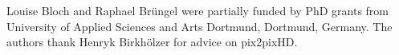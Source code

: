 \documentclass[runningheads]{llncs}
\begin{document}
Louise Bloch and Raphael Brüngel were partially funded by PhD grants from University of Applied Sciences and Arts Dortmund, Dortmund, Germany. The authors thank Henryk Birkh\"olzer for advice on pix2pixHD.



% 


\end{document}
